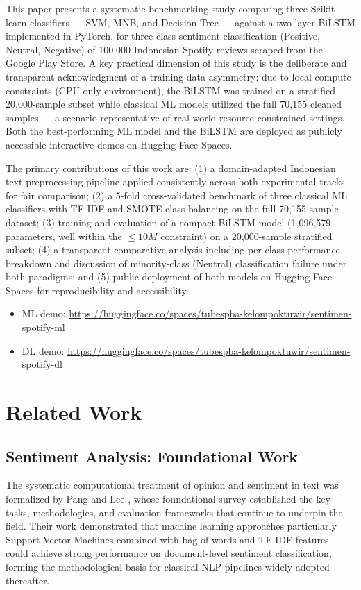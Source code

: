 \documentclass{article}
\begin{document}
This paper presents a systematic benchmarking study comparing three Scikit-learn classifiers --- SVM, MNB, and Decision Tree --- against a two-layer BiLSTM implemented in PyTorch, for three-class sentiment classification (Positive, Neutral, Negative) of 100,000 Indonesian Spotify reviews scraped from the Google Play Store. A key practical dimension of this study is the deliberate and transparent acknowledgment of a training data asymmetry: due to local compute constraints (CPU-only environment), the BiLSTM was trained on a stratified 20,000-sample subset while classical ML models utilized the full 70,155 cleaned samples --- a scenario representative of real-world resource-constrained settings. Both the best-performing ML model and the BiLSTM are deployed as publicly accessible interactive demos on Hugging Face Spaces.

The primary contributions of this work are: (1) a domain-adapted Indonesian text preprocessing pipeline applied consistently across both experimental tracks for fair comparison; (2) a 5-fold cross-validated benchmark of three classical ML classifiers with TF-IDF and SMOTE class balancing on the full 70,155-sample dataset; (3) training and evaluation of a compact BiLSTM model (1,096,579 parameters, well within the $\le10M$ constraint) on a 20,000-sample stratified subset; (4) a transparent comparative analysis including per-class performance breakdown and discussion of minority-class (Neutral) classification failure under both paradigms; and (5) public deployment of both models on Hugging Face Spaces for reproducibility and accessibility.

\begin{itemize}
    \item ML demo: \url{https://huggingface.co/spaces/tubespba-kelompoktuwir/sentimen-spotify-ml}
    \item DL demo: \url{https://huggingface.co/spaces/tubespba-kelompoktuwir/sentimen-spotify-dl}
\end{itemize}

\section{Related Work}
\label{sec:related}

\subsection{Sentiment Analysis: Foundational Work}
The systematic computational treatment of opinion and sentiment in text was formalized by Pang and Lee \cite{pang2008opinion}, whose foundational survey established the key tasks, methodologies, and evaluation frameworks that continue to underpin the field. Their work demonstrated that machine learning approaches particularly Support Vector Machines combined with bag-of-words and TF-IDF features --- could achieve strong performance on document-level sentiment classification, forming the methodological basis for classical NLP pipelines widely adopted thereafter.
\end{document}
